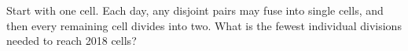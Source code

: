Start with one cell. Each day, any disjoint pairs may fuse into single cells, and then every remaining cell divides into two. What is the fewest individual divisions needed to reach 2018 cells?
